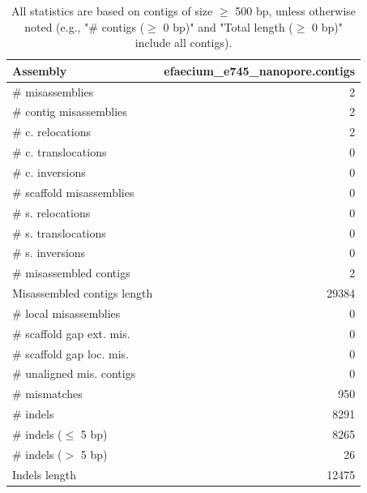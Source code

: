 \documentclass[12pt,a4paper]{article}
\begin{document}
\begin{table}[ht]
\begin{center}
\caption{All statistics are based on contigs of size $\geq$ 500 bp, unless otherwise noted (e.g., "\# contigs ($\geq$ 0 bp)" and "Total length ($\geq$ 0 bp)" include all contigs).}
\begin{tabular}{|l*{1}{|r}|}
\hline
Assembly & efaecium\_e745\_nanopore.contigs \\ \hline
\# misassemblies & 2 \\ \hline
\hspace{2mm}\# contig misassemblies & 2 \\ \hline
\hspace{5mm}\# c. relocations & 2 \\ \hline
\hspace{5mm}\# c. translocations & 0 \\ \hline
\hspace{5mm}\# c. inversions & 0 \\ \hline
\hspace{2mm}\# scaffold misassemblies & 0 \\ \hline
\hspace{5mm}\# s. relocations & 0 \\ \hline
\hspace{5mm}\# s. translocations & 0 \\ \hline
\hspace{5mm}\# s. inversions & 0 \\ \hline
\# misassembled contigs & 2 \\ \hline
Misassembled contigs length & 29384 \\ \hline
\# local misassemblies & 0 \\ \hline
\# scaffold gap ext. mis. & 0 \\ \hline
\# scaffold gap loc. mis. & 0 \\ \hline
\# unaligned mis. contigs & 0 \\ \hline
\# mismatches & 950 \\ \hline
\# indels & 8291 \\ \hline
\hspace{5mm}\# indels ($\leq$ 5 bp) & 8265 \\ \hline
\hspace{5mm}\# indels ($>$ 5 bp) & 26 \\ \hline
Indels length & 12475 \\ \hline
\end{tabular}
\end{center}
\end{table}
\end{document}
